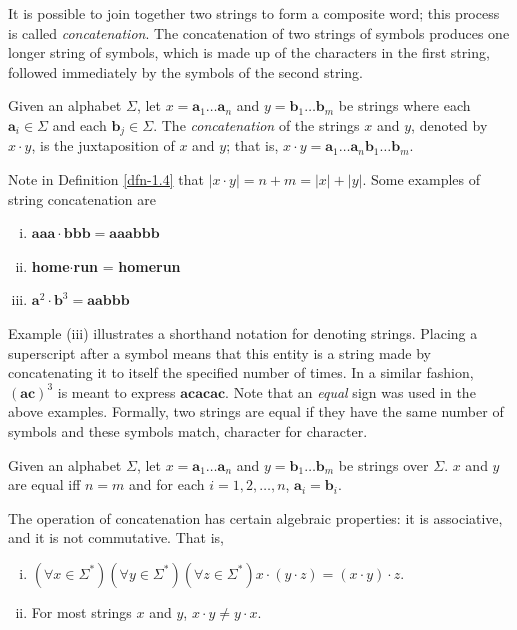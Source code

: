 It is possible to join together two strings to form a composite word; this
process is called \emph{concatenation}. The concatenation of two strings of
symbols produces one longer string of symbols, which is made up of the
characters in the first string, followed immediately by the symbols of the
second string.

\begin{dfn}\label{dfn-1.4}
Given an alphabet $\Sigma$, let $x = \pmb{a}_1\ldots\pmb{a}_n$ and $y=\pmb{b}_1
\ldots\pmb{b}_m$ be strings where each $\pmb{a}_i\in\Sigma$ and each $\pmb{b}_j
\in\Sigma$. The \emph{concatenation} of the strings $x$ and $y$, denoted by $x\cdot y$,
is the juxtaposition of $x$ and $y$; that is, $x\cdot y=\pmb{a}_1\ldots\pmb{a}_n
\pmb{b}_1\ldots\pmb{b}_m$.
\end{dfn}

Note in Definition \ref{dfn-1.4} that $|x \cdot y| = n + m = |x| + |y|$. Some
examples of string concatenation are
\begin{enumerate}[i.]
\item $\pmb{aaa}\cdot\pmb{bbb}=\pmb{aaabbb}$ 
\item \textbf{home}$\cdot$\textbf{run} = \textbf{homerun}
\item $\pmb{a}^2\cdot\pmb{b}^3=\pmb{aabbb}$
\end{enumerate}

Example (iii) illustrates a shorthand notation for denoting strings. Placing a
superscript after a symbol means that this entity is a string made by
concatenating it to itself the specified number of times. In a similar fashion,
$(\pmb{ac})^3$ is meant to express  $\pmb{acacac}$. Note that an \emph{equal}
sign was used in the above examples. Formally, two strings are equal if they
have the same number of symbols and these symbols match, character for character.

\begin{dfn}\label{dfn-1.5}
Given an alphabet $\Sigma$, let $x=\pmb{a}_1\ldots\pmb{a}_n$ and $y=\pmb{b}_1
\ldots\pmb{b}_m$ be strings over $\Sigma$. $x$ and $y$ are equal iff $n = m$ and
for each $i=1,2,\ldots,n$, $\pmb{a}_i=\pmb{b}_i$.
\end{dfn}

The operation of concatenation has certain algebraic properties: it is
associative, and it is not commutative. That is,
\begin{enumerate}[i.]
\item $(\forall x \in \Sigma^*)(\forall y \in \Sigma^*)(\forall z \in \Sigma^*)
	x \cdot (y \cdot z) = (x \cdot y ) \cdot z.$
\item For most strings $x$ and $y$, $x \cdot y \not= y \cdot x$. 
\end{enumerate}

